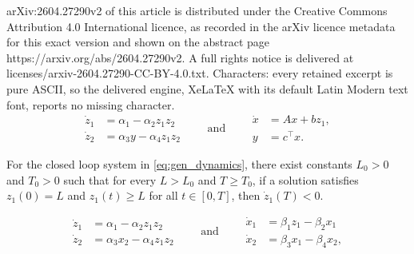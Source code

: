\documentclass[10pt,a4paper]{amsart}
\begin{document}
arXiv:2604.27290v2 of this article is distributed under the Creative Commons Attribution 4.0 International licence, as recorded in the arXiv licence metadata for this exact version and shown on the abstract page https://arxiv.org/abs/2604.27290v2. A full rights notice is delivered at licenses/arxiv-2604.27290-CC-BY-4.0.txt. Characters: every retained excerpt is pure ASCII, so the delivered engine, XeLaTeX with its default Latin Modern text font, reports no missing character.
\begin{equation}\label{eq:gen_dynamics}
    \begin{aligned}
    \dot z_1 &= \alpha_1-\alpha_2 z_1 z_2\\[.25em]
    \dot z_2 &= \alpha_3 y-\alpha_4 z_1 z_2
    \end{aligned}
    \qquad \textrm{and} \qquad
    \begin{aligned}
    \dot x &= Ax + bz_1,\\
    y &= c^{\top} x.
    \end{aligned}
\end{equation}

\begin{theorem}
    \label{thm:GenLin-HasProperty}
    For the closed loop system in \eqref{eq:gen_dynamics}, there exist constants $L_0>0$ and $T_0>0$ such that for every $L>L_0$ and $T\geq T_0$, if a solution satisfies $z_1(0)=L$ and $z_1(t)\geq L$ for all $t\in [0,T]$, then $\dot z_1(T)<0$.
\end{theorem}

\begin{equation}\label{eq:ca_dynamics}
    \begin{aligned}
    \dot z_1 &= \alpha_1-\alpha_2 z_1 z_2\\
    \dot z_2 &= \alpha_3 x_2-\alpha_4 z_1 z_2
    \end{aligned}
    \qquad \textrm{and} \qquad
    \begin{aligned}
    \dot x_1 &= \beta_1 z_1-\beta_2 x_1\\
    \dot x_2 &= \beta_3 x_1-\beta_4 x_2,
    \end{aligned}
\end{equation}
\end{document}
